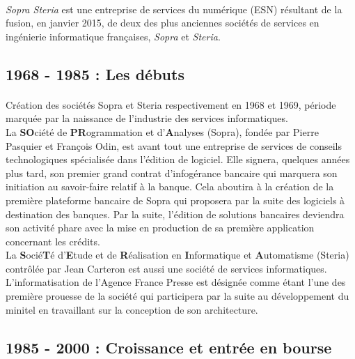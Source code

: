 \paragraph{}
\textit{Sopra Steria} est une entreprise de services du numérique (ESN) résultant de la fusion, en janvier 2015, de deux des plus anciennes sociétés de services en ingénierie informatique françaises, \textit{Sopra} et \textit{Steria}.

\subsection{1968 - 1985 : Les débuts}

\paragraph{}
Création des sociétés Sopra et Steria respectivement en 1968 et 1969, période marquée par la naissance de l'industrie des services informatiques.\\

La \textbf{SO}ciété de \textbf{PR}ogrammation et d'\textbf{A}nalyses (Sopra), fondée par Pierre Pasquier et François Odin, est avant tout une entreprise de services de conseils technologiques spécialisée dans l'édition de logiciel. Elle signera, quelques années plus tard, son premier grand contrat d'infogérance bancaire qui marquera son initiation au savoir-faire relatif à la banque. Cela aboutira à la création de la première plateforme bancaire de Sopra qui proposera par la suite des logiciels à destination des banques. Par la suite, l'édition de solutions bancaires deviendra son activité phare avec la mise en production de sa première application concernant les crédits.\\

La \textbf{S}ocié\textbf{T}é d'\textbf{E}tude et de \textbf{R}éalisation en \textbf{I}nformatique et \textbf{A}utomatisme (Steria) contrôlée par Jean Carteron est aussi une société de services informatiques. L'informatisation de l'Agence France Presse est désignée comme étant l'une des première prouesse de la société qui participera par la suite au développement du minitel en travaillant sur la conception de son architecture.

\subsection{1985 - 2000 : Croissance et entrée en bourse}

